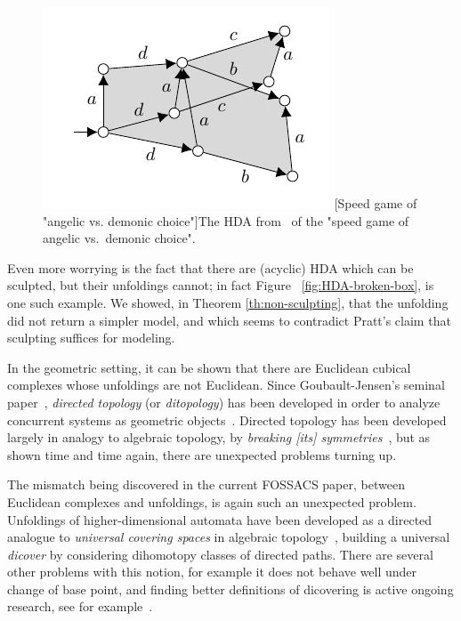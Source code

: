     \begin{figure}[tbp]
        \centering
        \includegraphics[scale=1.2]{Figures/6.Conclusion/angelicvsdemonic.pdf}
        [Speed game of "angelic vs. demonic choice"]{The HDA from~\cite{Johansen16STstruct} of the "speed game of angelic vs.\ demonic choice".}
        \label{fig:speedAngelDemon}
    \end{figure}

    Even more worrying is the fact that there are (acyclic) HDA which can be sculpted, but their unfoldings cannot; in fact Figure ~\ref{fig:HDA-broken-box}, is one such example. We showed, in Theorem \ref{th:non-sculpting}, that the unfolding did not return a simpler model, and which seems to contradict Pratt's claim that sculpting suffices for modeling.
    
    In the geometric setting, it can be shown that there are Euclidean cubical complexes whose unfoldings are not Euclidean.  Since Goubault-Jensen's seminal paper~\cite{Goubault92homologyof}, \emph{directed topology} (or \emph{ditopology}) has been developed in order to analyze concurrent systems as geometric objects~\cite{Grandis09book, Fajstrup06AlgebraicTopologyConcurrency, Fajstrup16DirectedAlgebraicTopologyConcurrency}.  Directed topology has been developed largely in analogy to algebraic topology, by \emph{breaking [its] symmetries}~\cite{Grandis09book}, but as shown time and time again, there are unexpected problems turning up.

    The mismatch being discovered in the current FOSSACS paper, between Euclidean complexes and unfoldings, is again such an unexpected problem.  Unfoldings of higher-dimensional automata have been developed as a directed analogue to \emph{universal covering spaces} in algebraic topology~\cite{Glabbeek91BismiluationHDA, Fahrenberg05PhD}, building a universal \emph{dicover} by considering dihomotopy classes of directed paths.  There are several other problems with this notion, for example it does not behave well under change of base point, and finding better definitions of dicovering is active ongoing research, see for example~\cite{jeremy18TreesPartialHDA}.
    
